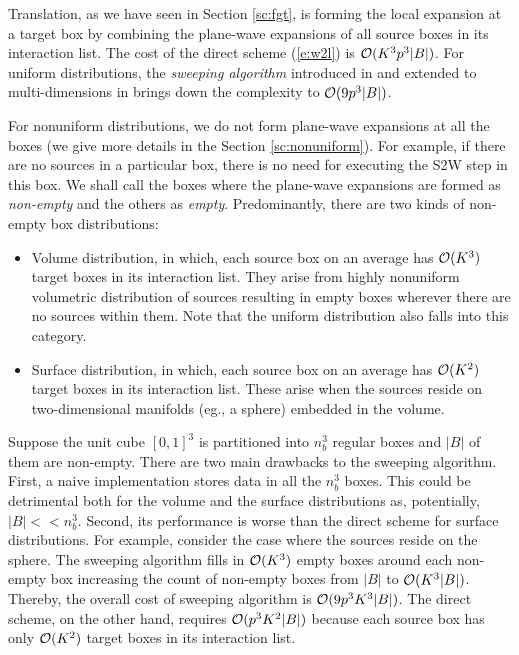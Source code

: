 Translation, as we have seen in Section \ref{sc:fgt}, is forming the local expansion at a target box by combining the plane-wave expansions of all source boxes in its interaction list.  The cost of the direct scheme (\ref{e:w2l}) is $\mathcal{O}(K^3 p^3 |B|)$. For uniform distributions, the {\em sweeping algorithm} introduced in \cite{greengard98} and extended to multi-dimensions in \cite{fggt} brings down the complexity to $\mathcal{O}(9p^3 |B|)$. 

For nonuniform distributions, we do not form plane-wave expansions at all the boxes (we give more details in the Section \ref{sc:nonuniform}). For example, if there are no sources in a particular box, there is no need for executing the S2W step in this box. We shall call the boxes where the plane-wave expansions are formed as {\em non-empty} and the others as {\em empty}. Predominantly, there are two kinds of non-empty box distributions:
%
\begin{itemize}
 \item Volume distribution, in which, each source box on an average has $\mathcal{O}(K^3)$ target boxes in its interaction list.  They arise from highly nonuniform volumetric distribution of sources resulting in empty boxes wherever there are no sources within them. Note that the uniform distribution also falls into this category.
 
 \item Surface distribution, in which, each source box on an average has $\mathcal{O}(K^2)$ target boxes in its interaction list. These arise when the sources reside on two-dimensional manifolds (eg., a sphere) embedded in the volume. 
\end{itemize}

Suppose the unit cube $[0, 1]^3$ is partitioned into $n_b^3$ regular boxes and $|B|$ of them are non-empty. There are two main drawbacks to the sweeping algorithm. First, a naive implementation stores data in all the $n_b^3$ boxes. This could be detrimental both for the volume and the surface distributions as, potentially, $|B| <\!< n_b^3$. Second, its performance is worse than the direct scheme for surface distributions. For example, consider the case where the sources reside on the sphere. The sweeping algorithm fills in $\mathcal{O}(K^3)$ empty boxes around each non-empty box increasing the count of non-empty boxes from $|B|$ to $\mathcal{O}(K^3 |B|)$. Thereby, the overall cost of sweeping algorithm is $\mathcal{O}(9 p^3 K^3 |B|)$. The direct scheme, on the other hand, requires $\mathcal{O}(p^3 K^2 |B|)$ because each source box has only $\mathcal{O}(K^2)$ target boxes in its interaction list. 

